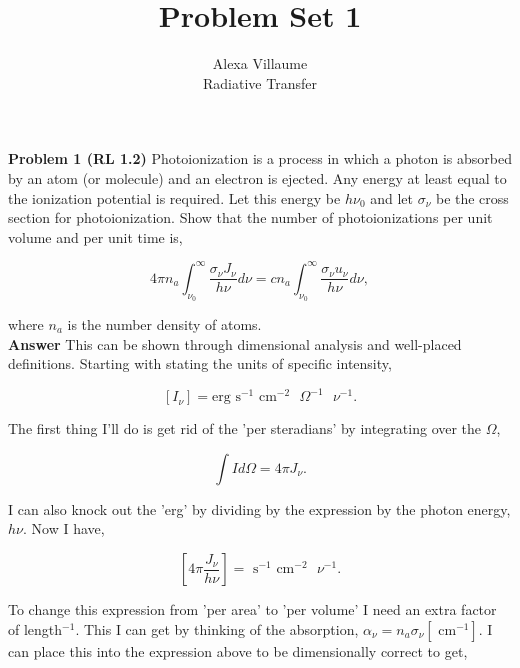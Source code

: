 \documentclass[12pt]{article}
\begin{document}
 
 \title{Problem Set 1}
\author{Alexa Villaume\\ 
Radiative Transfer} 
 
\maketitle

\noindent \textbf{Problem 1 (RL 1.2)} Photoionization is a process in which a photon is absorbed by an atom (or molecule) and an electron is ejected. Any energy at least equal to the ionization potential is required. Let this energy be $h\nu_0$ and let $\sigma_\nu$ be the cross section for photoionization. Show that the number of photoionizations per unit volume and per unit time is,

\begin{equation*}
4\pi n_a \int_{\nu_0}^{\infty} \frac{\sigma_\nu J_\nu}{h\nu}d\nu = cn_a\int_{\nu_0}^\infty\frac{\sigma_\nu u_\nu}{h\nu}d\nu,
\end{equation*}

\noindent where $n_a$ is the number density of atoms.\\

\noindent \textbf{Answer} This can be shown through dimensional analysis and well-placed definitions. Starting with stating the units of specific intensity, 

\begin{equation}
\left[ I_\nu \right] = \text{erg} \text{ s}^{-1} \text{ cm}^{-2} \text{ }\Omega^{-1} \text{ }\nu^{-1}.
\end{equation}

\noindent The first thing I'll do is get rid of the 'per steradians' by integrating over the $\Omega$,

\begin{equation}
\int I d\Omega = 4\pi J_\nu.
\end{equation} 

\noindent I can also knock out the 'erg' by dividing by the expression by the photon energy, $h\nu$. Now I have,

\begin{equation}
\left[ 4\pi \frac{J_\nu}{h\nu} \right] = \text{ s}^{-1} \text{ cm}^{-2}  \text{ }\nu^{-1}.
\end{equation}

\noindent To change this expression from 'per area' to 'per volume' I need an extra factor of length$^{-1}$. This I can get by thinking of the absorption, $\alpha_\nu = n_a \sigma_\nu \left[\text{ cm}^{-1}\right]$. I can place this into the expression above to be dimensionally correct to get,
\end{document}
